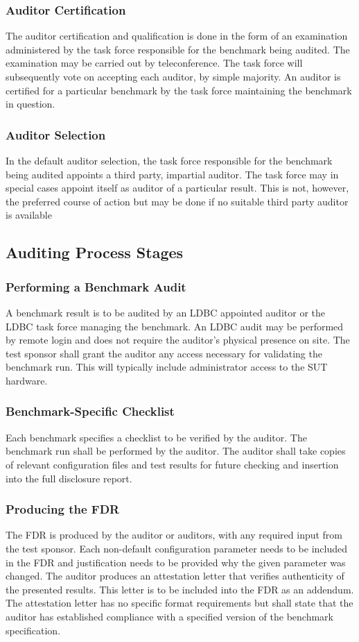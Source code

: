 \subsubsection{Auditor Certification}
The auditor certification and qualification is done in the form of an examination administered by the task force responsible for the benchmark being audited. The examination may be carried out by teleconference. The task force will subsequently vote on accepting each auditor, by simple majority. An auditor is certified for a particular benchmark by the task force maintaining the benchmark in question.

\subsubsection{Auditor Selection}
In the default auditor selection, the task force responsible for the benchmark being audited appoints a third party, impartial auditor. The task force may in special cases appoint itself as auditor of a particular result. This is not, however, the preferred course of action but may be done if no suitable third party auditor is available


\subsection{Auditing Process Stages}
\subsubsection{Performing a Benchmark Audit}
A benchmark result is to be audited by an LDBC appointed auditor or the LDBC task force managing the benchmark. An LDBC audit may be performed by remote login and does not require the auditor's physical presence on site. The test sponsor shall grant the auditor any access necessary for validating the benchmark run. This will typically include administrator access to the SUT hardware.
    
\subsubsection{Benchmark-Specific Checklist}
Each benchmark specifies a checklist to be verified by the auditor. The benchmark run shall be performed by the auditor. The auditor shall take copies of relevant configuration files and test results for future checking and insertion into the full disclosure report.
    
\subsubsection{Producing the FDR}
The FDR is produced by the auditor or auditors, with any required input from the test sponsor. Each non-default configuration parameter needs to be included in the FDR and justification needs to be provided why the given parameter was changed.
The auditor produces an attestation letter that verifies authenticity of the presented results. This letter is to be included into the FDR as an addendum. The attestation letter has no specific format requirements but shall state that the auditor has established compliance with a specified version of the benchmark specification.

